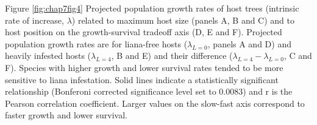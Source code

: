 \documentclass[b5paper,justified]{tufte-book} %
\begin{document}
\begin{fullwidth}
\begin{figure*}
\hspace*{0.2cm} \begin{minipage}{14cm}
\vspace{.1cm}
\footnotesize Figure \ref{fig:chap7fig4} 
 Projected population growth rates of host trees (intrinsic rate of increase, $\lambda$) related to maximum host size (panels A, B and C) and to host position on the growth-survival tradeoff axis (D, E and F). Projected population growth rates are for liana-free hosts ($\lambda_{L=0}$, panels A and D) and heavily infested hosts ($\lambda_{L=4}$, B and E) and their difference ($\lambda_{L=4}-\lambda_{L=0}$, C and F). Species with higher growth and lower survival rates tended to be more sensitive to liana infestation. Solid lines indicate a statistically significant relationship (Bonferoni corrected significance level set to $0.0083$) and r is the Pearson correlation coefficient. Larger values on the slow-fast axis correspond to faster growth and lower survival.
\end{minipage}
\end{figure*}


\end{fullwidth}
\end{document}
